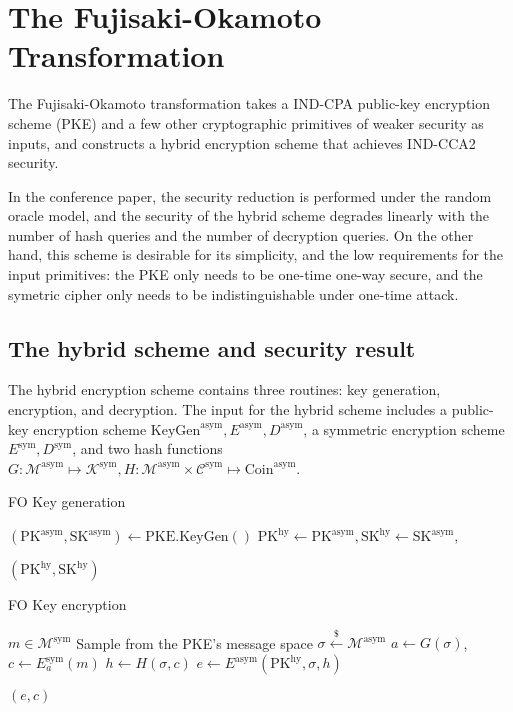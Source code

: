 \documentclass{article}
\newcommand{\leftsample}{\overset{{\scriptscriptstyle\$}}{\leftarrow}}
\begin{document}
\section{The Fujisaki-Okamoto Transformation}
The Fujisaki-Okamoto transformation \cite{fujisaki1999secure} takes a IND-CPA public-key encryption scheme (PKE) and a few other cryptographic primitives of weaker security as inputs, and constructs a hybrid encryption scheme that achieves IND-CCA2 security.

In the conference paper, the security reduction is performed under the random oracle model, and the security of the hybrid scheme degrades linearly with the number of hash queries and the number of decryption queries. On the other hand, this scheme is desirable for its simplicity, and the low requirements for the input primitives: the PKE only needs to be one-time one-way secure, and the symetric cipher only needs to be indistinguishable under one-time attack.


\subsection{The hybrid scheme and security result}
The hybrid encryption scheme contains three routines: key generation, encryption, and decryption. The input for the hybrid scheme includes a public-key encryption scheme $\text{KeyGen}^\text{asym}, E^\text{asym}, D^\text{asym}$, a symmetric encryption scheme $E^\text{sym}, D^\text{sym}$, and two hash functions $G: \mathcal{M}^\text{asym} \mapsto \mathcal{K}^\text{sym}, H: \mathcal{M}^\text{asym} \times \mathcal{C}^\text{sym} \mapsto \text{Coin}^\text{asym}$.

\begin{algorithm}
\caption{FO Key generation}\label{fo-key-gen}
\begin{algorithmic}[1]  %
    \State $
        (\text{PK}^\text{asym}, \text{SK}^\text{asym}) 
        \leftarrow \text{PKE.KeyGen}()
    $
    \State $
        \text{PK}^\text{hy} \leftarrow \text{PK}^\text{asym},
        \text{SK}^\text{hy} \leftarrow \text{SK}^\text{asym},
    $

    \State \Return $(\text{PK}^\text{hy}, \text{SK}^\text{hy})$
\end{algorithmic}
\end{algorithm}

\begin{algorithm}
\caption{FO Key encryption}\label{fo-key-enc}
\begin{algorithmic}[1]  %
    \Require $m \in \mathcal{M}^\text{sym}$
    \State Sample from the PKE's message space $\sigma \leftsample \mathcal{M}^\text{asym}$
    \State $a \leftarrow G(\sigma)$, $c \leftarrow E^\text{sym}_a(m)$
    \State $h \leftarrow H(\sigma, c)$
    \State $e \leftarrow E^\text{asym}(\text{PK}^\text{hy}, \sigma, h)$

    \State \Return $(e, c)$
\end{algorithmic}
\end{algorithm}
\end{document}

